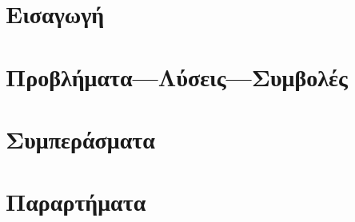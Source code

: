





\part{Εισαγωγή}
  

\part{Προβλήματα---Λύσεις---Συμβολές}
  

\part{Συμπεράσματα}

\part{Παραρτήματα}
  

\printbibliography[heading=bibintoc,title={\textgreek{Αναφορές}}]


